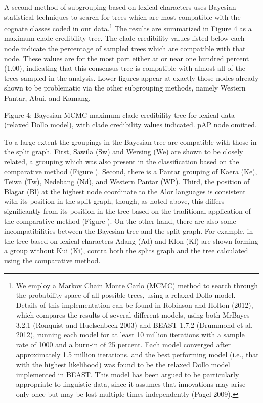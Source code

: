 A second method of subgrouping based on lexical characters uses Bayesian statistical techniques to search for trees which are most compatible with the cognate classes coded in our data.\footnote{ We employ a Markov Chain Monte Carlo (MCMC) method to search through the probability space of all possible trees, using a relaxed Dollo model. Details of this implementation can be found in Robinson and Holton (2012), which compares the results of  several different models, using both MrBayes 3.2.1 (Ronquist and Huelsenbeck 2003) and BEAST 1.7.2 (Drummond et al. 2012), running each model for at least 10 million iterations with a sample rate of 1000 and a burn-in of 25 percent. Each model converged after approximately 1.5 million iterations, and the best performing model (i.e., that with the highest likelihood) was found to be the relaxed Dollo model implemented in BEAST. This model has been argued to be particularly appropriate to linguistic data, since it assumes that innovations may arise only once but may be lost 
multiple times independently (Pagel 2009). } The results are summarized in Figure 4 as a maximum clade credibility tree. The clade credibility values listed below each node indicate the percentage of sampled trees which are compatible with that node. These values are for the most part either at or near one hundred percent (1.00), indicating that this consensus tree is compatible with almost all of the trees sampled in the analysis. Lower figures appear at exactly those nodes already shown to be problematic via the other subgrouping methods, namely Western Pantar, Abui, and Kamang.\textbf{ }

{\centering
\label{bkm:Ref317516795}Figure 4: Bayesian MCMC maximum clade credibility tree for lexical data (relaxed Dollo model), with clade credibility values indicated. pAP node omitted.
\par}

{%
 \par}

To a large extent the groupings in the Bayesian tree are compatible with those in the split graph. First, Sawila (Sw) and Wersing (We) are shown to be closely related, a grouping which was also present in the classification based on the comparative method (Figure ). Second, there is a Pantar grouping of Kaera (Ke), Teiwa (Tw), Nedebang (Nd), and Western Pantar (WP). Third, the position of Blagar (Bl) at the highest node coordinate to the Alor languages is consistent with its position in the split graph, though, as noted above, this differs significantly from its position in the tree based on the traditional application of the comparative method (Figure ). On the other hand, there are also some incompatibilities between the Bayesian tree and the split graph. For example, in the tree based on lexical characters Adang (Ad) and Klon (Kl) are shown forming a group without Kui (Ki), contra both the splits graph and the tree calculated using the comparative method. 


